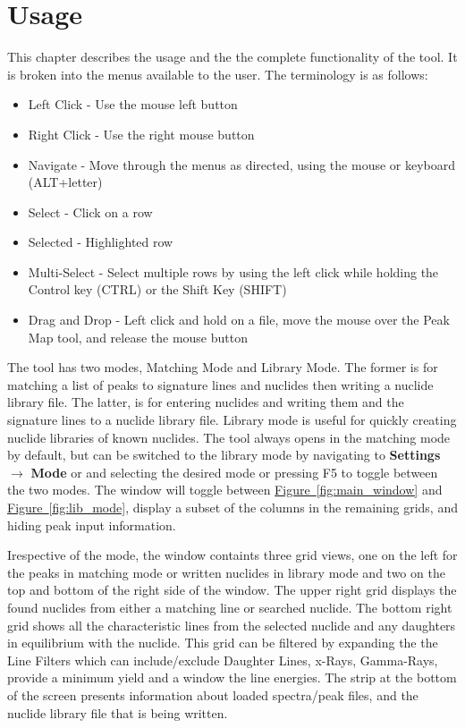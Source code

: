 \documentclass[12pt,report,justified]{SANDreport}
\begin{document}
    \chapter{Usage}\label{sec:usage}
    This chapter describes the usage and the the complete functionality of the tool. It is broken into
    the menus available to the user. The terminology is as follows:
    \begin{itemize}
        \item Left Click - Use the mouse left button
        \item Right Click - Use the right mouse button
        \item Navigate - Move through the menus as directed, using the mouse or keyboard (ALT+letter)
        \item Select - Click on a row
        \item Selected - Highlighted row
        \item Multi-Select - Select multiple rows by using the left click while holding the Control key (CTRL) or the Shift Key (SHIFT)\
        \item Drag and Drop - Left click and hold on a file, move the mouse over the Peak Map tool, and release the mouse button
    \end{itemize}
The tool has two modes, Matching Mode and Library Mode. The former is for matching a list of
peaks to signature lines and nuclides then writing a nuclide library file. The latter, is for entering
nuclides and writing them and the signature lines to a nuclide library file. Library mode is useful
for quickly creating nuclide libraries of known nuclides. The tool always opens in the matching
mode by default, but can be switched to the library mode by navigating to \textbf{Settings}
\(\rightarrow\) \textbf{Mode} or and selecting the desired mode or pressing F5 to toggle between the
two modes. The window will toggle between \hyperref[fig:main_window]{Figure~\ref{fig:main_window}}
and \hyperref[fig:lib_mode]{Figure~\ref{fig:lib_mode}}, display a subset of the columns in the
remaining grids, and hiding peak input information.

Irespective of the mode, the window containts three grid views, one on the left for the peaks in
matching mode or written nuclides in library mode and two on the top and bottom of the right side
of the window. The upper right grid displays the found nuclides from either a matching line or searched
nuclide. The bottom right grid shows all the characteristic lines from the selected nuclide and any
daughters in equilibrium with the nuclide. This grid can be filtered by expanding the the Line Filters
which can include/exclude Daughter Lines, x-Rays, Gamma-Rays, provide a minimum yield and a window the
line energies. The strip at the bottom of the screen presents information about loaded spectra/peak
files, and the nuclide library file that is being written.
\end{document}
